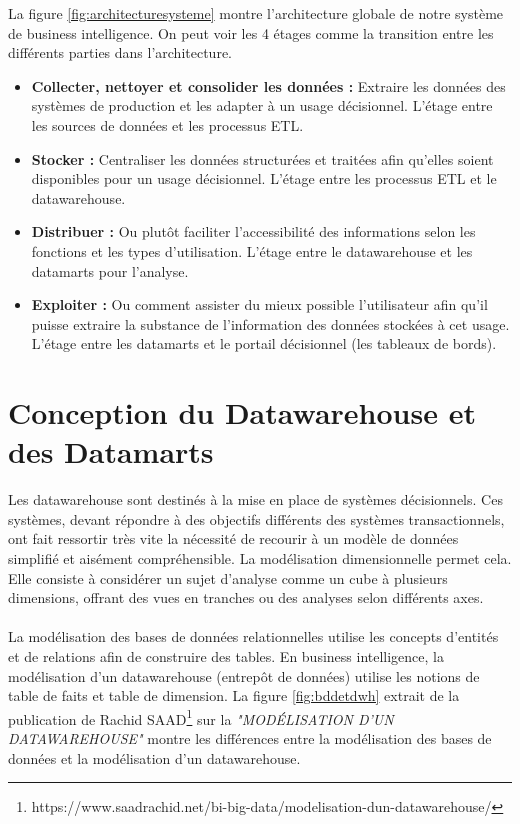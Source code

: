 La figure \ref{fig:architecturesysteme} montre l’architecture globale de notre système de business intelligence. On peut voir les 4 étages comme la transition entre les différents parties dans l'architecture.

\begin{itemize}
    \item \textbf{Collecter, nettoyer et consolider les données :} Extraire les données des systèmes de production et les adapter à un usage décisionnel. L'étage entre les sources de données et les processus ETL.
    \item \textbf{Stocker :} Centraliser les données structurées et traitées afin qu'elles soient disponibles pour un usage décisionnel. L'étage entre les processus ETL et le datawarehouse.
    \item \textbf{Distribuer :} Ou plutôt faciliter l'accessibilité des informations selon les fonctions et les types d'utilisation. L'étage entre le datawarehouse et les datamarts pour l'analyse.
    \item \textbf{Exploiter :} Ou comment assister du mieux possible l'utilisateur afin qu'il puisse extraire la substance de l'information des données stockées à cet usage. L'étage entre les datamarts et le portail décisionnel (les tableaux de bords).
\end{itemize}

\section{Conception du Datawarehouse et des Datamarts}
Les datawarehouse sont destinés à la mise en place de systèmes décisionnels. Ces systèmes, devant répondre à des objectifs différents des systèmes transactionnels, ont fait ressortir très vite la nécessité de recourir à un modèle de données simplifié et aisément compréhensible. La modélisation dimensionnelle permet cela. Elle consiste à considérer un sujet d’analyse comme un cube à plusieurs dimensions, offrant des vues en tranches ou des analyses selon différents axes.
\paragraph{}
La modélisation des bases de données relationnelles utilise les concepts d’entités et de relations afin de construire des tables. En business intelligence, la modélisation d’un datawarehouse (entrepôt de données) utilise les notions de table de faits et table de dimension. La figure \ref{fig:bddetdwh} extrait de la publication de Rachid SAAD\footnote{https://www.saadrachid.net/bi-big-data/modelisation-dun-datawarehouse/} sur la \textit{"MODÉLISATION D’UN DATAWAREHOUSE"} montre les différences entre la modélisation des bases de données et la modélisation d’un datawarehouse.

